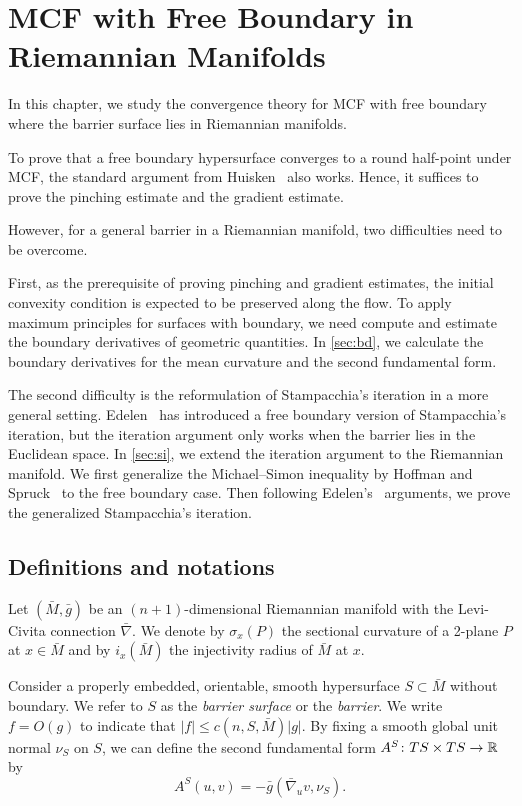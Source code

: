 

\chapter{MCF with Free Boundary in Riemannian Manifolds} \label{chap:fbmcf}

In this chapter, we study the convergence theory for MCF with free boundary where the barrier surface lies in Riemannian manifolds.

To prove that a free boundary hypersurface converges to a round half-point under MCF, the standard argument from Huisken~\cite{huisken_flow_1984} also works. Hence, it suffices to prove the pinching estimate and the gradient estimate.

However, for a general barrier in a Riemannian manifold, two difficulties need to be overcome. 

First, as the prerequisite of proving pinching and gradient estimates, the initial convexity condition is expected to be preserved along the flow. To apply maximum principles for surfaces with boundary, we need compute and estimate the boundary derivatives of geometric quantities. In \autoref{sec:bd}, we calculate the boundary derivatives for the mean curvature and the second fundamental form.

The second difficulty is the reformulation of Stampacchia's iteration in a more general setting. Edelen~\cite{edelen_convexity_2016} has introduced a free boundary version of Stampacchia's iteration, but the iteration argument only works when the barrier lies in the Euclidean space. In \autoref{sec:si}, we extend the iteration argument to the Riemannian manifold. We first generalize the Michael--Simon inequality by Hoffman and Spruck~\cite{hoffman_sobolev_1974} to the free boundary case. Then following Edelen's~\cite{edelen_convexity_2016} arguments, we prove the generalized Stampacchia's iteration.

\section{Definitions and notations}

Let $(\bar{M}, \bar{g})$ be an $(n+1)$-dimensional Riemannian manifold with the Levi-Civita connection $\bar{\nabla }$. We denote by $\sigma _x(P)$ the sectional curvature of a 2-plane $P$ at $x \in \bar{M}$ and by $i_x(\bar{M})$ the injectivity radius of $\bar{M}$ at $x$. 

Consider a properly embedded, orientable, smooth hypersurface $S \subset \bar{M}$ without boundary. We refer to $S$ as the \textit{barrier surface} or the \textit{barrier}. We write $f=O(g)$ to indicate that $\left| f \right| \leq c(n,S,\bar{M})\left| g \right| $. By fixing a smooth global unit normal $\nu _S$ on $S$, we can define the second fundamental form $A^S\colon TS \times TS \to \mathbb{R}$ by
\[A^S(u,v)=-\bar{g}(\bar{\nabla }_u v, \nu _S).\]

